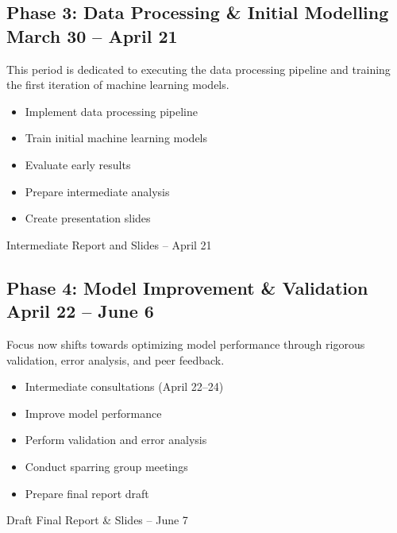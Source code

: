 \documentclass[12pt]{article}
\begin{document}
\subsection[Phase 3: Data Processing \& Initial Modelling]{Phase 3: Data Processing \& Initial Modelling \\ \normalsize March 30 – April 21}
This period is dedicated to executing the data processing pipeline and training the first iteration of machine learning models.

\begin{description}[style=multiline, leftmargin=3cm, font=\normalfont\textbf]
    \item[Tasks:] 
    \begin{itemize}[nosep, leftmargin=*]
        \item Implement data processing pipeline
        \item Train initial machine learning models
        \item Evaluate early results
        \item Prepare intermediate analysis
        \item Create presentation slides
    \end{itemize}
    \item[Deliverable:] Intermediate Report and Slides -- April 21
\end{description}

\subsection[Phase 4: Model Improvement \& Validation]{Phase 4: Model Improvement \& Validation \\ \normalsize April 22 – June 6}
Focus now shifts towards optimizing model performance through rigorous validation, error analysis, and peer feedback.

\begin{description}[style=multiline, leftmargin=3cm, font=\normalfont\textbf]
    \item[Tasks:] 
    \begin{itemize}[nosep, leftmargin=*]
        \item Intermediate consultations (April 22–24)
        \item Improve model performance
        \item Perform validation and error analysis
        \item Conduct sparring group meetings
        \item Prepare final report draft
    \end{itemize}
    \item[Deliverable:] Draft Final Report \& Slides -- June 7
\end{description}
\end{document}
